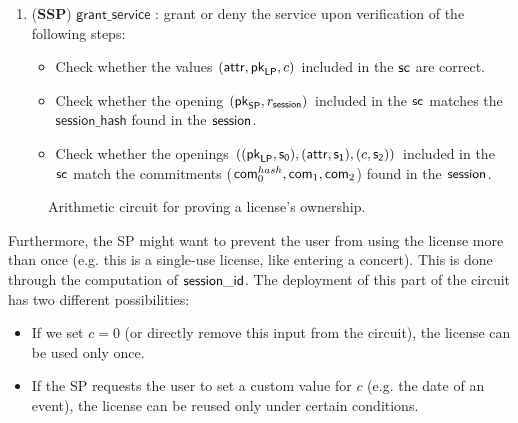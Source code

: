 \begin{enumerate}
	\item (\textbf{SSP}) $\mathsf{grant\_service}$ : grant or deny the service upon verification of the following steps:

	\begin{itemize}
		\item Check whether the values $(\mathsf{attr}, \mathsf{pk}_{\mathsf{LP}}, c)$ included in the $\mathsf{sc}$ are correct.
		\item Check whether the opening $(\mathsf{pk}_{\mathsf{SP}}, r_\mathsf{session})$ included in the $\mathsf{sc}$ matches the $\mathsf{session\_hash}$ found in the $\mathsf{session}$.
		\item Check whether the openings $((\mathsf{pk}_{\mathsf{LP}}, \mathsf{s_0}), (\mathsf{attr}, \mathsf{s_1}), (c, \mathsf{s_2}))$ included in the $\mathsf{sc}$ match the commitments ($\mathsf{com}_0^{hash}, \mathsf{com}_1, \mathsf{com}_2$) found in the $\mathsf{session}$.
	\end{itemize}

\end{enumerate}

\begin{figure}[h]
	\centering
	\setlength{\fboxsep}{5pt}%
	\setlength{\fboxrule}{0.3pt}%
	\caption{Arithmetic circuit for proving a license's ownership.}
	\label{fig:circuit_prove_nft}
\end{figure}

Furthermore, the SP might want to prevent the user from using the license more than once (e.g. this is a single-use license, like entering a concert). This is done through the computation of $\mathsf{session\_id}$. The deployment of this part of the circuit has two different possibilities:
\begin{itemize}
	\item If we set $c = 0$ (or directly remove this input from the circuit), the license can be used only once.
	\item If the SP requests the user to set a custom value for $c$ (e.g. the date of an event), the license can be reused only under certain conditions.
\end{itemize}
